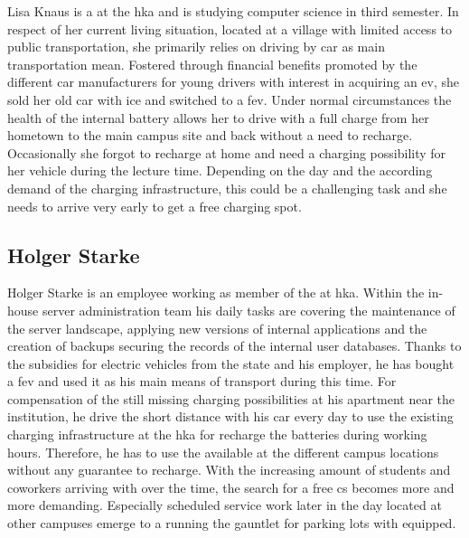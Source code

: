 Lisa Knaus is a  at the \acrshort{hka} and is studying computer science in third semester. In respect of her current living situation, located at a village with limited access to public transportation, she primarily relies on driving by car as main transportation mean.
Fostered through financial benefits promoted by the different car manufacturers for young drivers with interest in acquiring an \acrshort{ev}, she sold her old car with \acrshort{ice} and switched to a \acrfull{fev}. 
Under normal circumstances the health of the internal battery allows her to drive with a full charge from her hometown to the main campus site and back without a need to recharge. Occasionally she forgot to recharge at home and need a charging possibility for her vehicle during the lecture time.
Depending on the day and the according demand of the charging infrastructure, this could be a challenging task and she needs to arrive very early to get a free charging spot.

\subsection{Holger Starke}
\label{ch:Requirements Engineering:sec:Personas:ssec:Holger Starke}

Holger Starke is an employee working as member of the  at \acrshort{hka}. Within the in-house server administration team his daily tasks are covering the maintenance of the server landscape, applying new versions of internal applications and the creation of backups securing the records of the internal user databases. 
Thanks to the subsidies for electric vehicles from the state and his employer, he has bought a \acrshort{fev} and used it as his main means of transport during this time.
For compensation of the still missing charging possibilities at his apartment near the institution, he drive the short distance with his car every day to use the existing charging infrastructure at the \acrshort{hka} for recharge the batteries during working hours.
Therefore, he has to use the available  at the different campus locations without any guarantee to recharge. With the increasing amount of students and coworkers arriving with  over the time, the search for a free \acrshort{cs} becomes more and more demanding.
Especially scheduled service work later in the day located at other campuses emerge to a running the gauntlet for parking lots with  equipped. 

